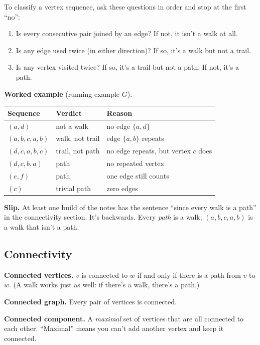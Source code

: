To classify a vertex sequence, ask these questions in order and stop at the first ``no'':
\begin{enumerate}
\item Is every consecutive pair joined by an edge? If not, it isn't a walk at all.
\item Is any edge used twice (in either direction)? If so, it's a walk but not a trail.
\item Is any vertex visited twice? If so, it's a trail but not a path. If not, it's a path.
\end{enumerate}

\textbf{Worked example} (running example $G$).
\begin{center}
\begin{tabularx}{\linewidth}{@{}llL@{}}
\toprule
Sequence & Verdict & Reason\\
\midrule
$(a,d)$ & not a walk & no edge $\{a,d\}$\\
$(a,b,c,a,b)$ & walk, not trail & edge $\{a,b\}$ repeats\\
$(d,c,a,b,c)$ & trail, not path & no edge repeats, but vertex $c$ does\\
$(d,c,b,a)$ & path & no repeated vertex\\
$(e,f)$ & path & one edge still counts\\
$(c)$ & trivial path & zero edges\\
\bottomrule
\end{tabularx}
\end{center}

\textbf{Slip.} At least one build of the notes has the sentence ``since every walk is a path'' in the connectivity section. It's backwards. Every \emph{path} is a walk; $(a,b,c,a,b)$ is a walk that isn't a path.

\subsection{Connectivity}

\begin{notebox}
\textbf{Connected vertices.} $v$ is connected to $w$ if and only if there is a path from $v$ to $w$. (A walk works just as well: if there's a walk, there's a path.)

\textbf{Connected graph.} Every pair of vertices is connected.

\textbf{Connected component.} A \emph{maximal} set of vertices that are all connected to each other. ``Maximal'' means you can't add another vertex and keep it connected.
\end{notebox}

